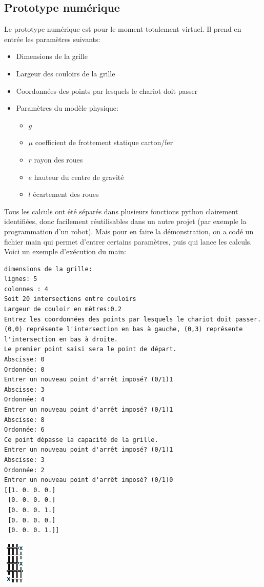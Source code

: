 \subsection{Prototype numérique}
Le prototype numérique est pour le moment totalement virtuel. Il prend en entrée les paramètres suivants:
\begin{itemize}
	\item Dimensions de la grille
	\item Largeur des couloirs de la grille
	\item Coordonnées des points par lesquels le chariot doit passer
	\item Paramètres du modèle physique:
		\begin{itemize}
			\item $g$
			\item $\mu$ coefficient de frottement statique carton/fer
			\item $r$ rayon des roues
			\item $e$ hauteur du centre de gravité
			\item $l$ écartement des roues
		\end{itemize}
\end{itemize}
Tous les calculs ont été séparés dans plusieurs fonctions python clairement identifiées, donc facilement réutilisables dans un autre projet (par exemple la programmation d'un robot). Mais pour en faire la démonstration, on a codé un fichier main qui permet d'entrer certains paramètres, puis qui lance les calculs. Voici un exemple d'exécution du main:
\begin{verbatim}
dimensions de la grille:
lignes: 5
colonnes : 4
Soit 20 intersections entre couloirs
Largeur de couloir en mètres:0.2
Entrez les coordonnées des points par lesquels le chariot doit passer. (0,0) représente l'intersection en bas à gauche, (0,3) représente l'intersection en bas à droite.
Le premier point saisi sera le point de départ.
Abscisse: 0
Ordonnée: 0
Entrer un nouveau point d'arrêt imposé? (0/1)1
Abscisse: 3
Ordonnée: 4
Entrer un nouveau point d'arrêt imposé? (0/1)1
Abscisse: 8
Ordonnée: 6
Ce point dépasse la capacité de la grille.
Entrer un nouveau point d'arrêt imposé? (0/1)1
Abscisse: 3
Ordonnée: 2
Entrer un nouveau point d'arrêt imposé? (0/1)0
[[1. 0. 0. 0.]
 [0. 0. 0. 0.]
 [0. 0. 0. 1.]
 [0. 0. 0. 0.]
 [0. 0. 0. 1.]]
\end{verbatim}
\includegraphics{termGrillePoints.png}\\

